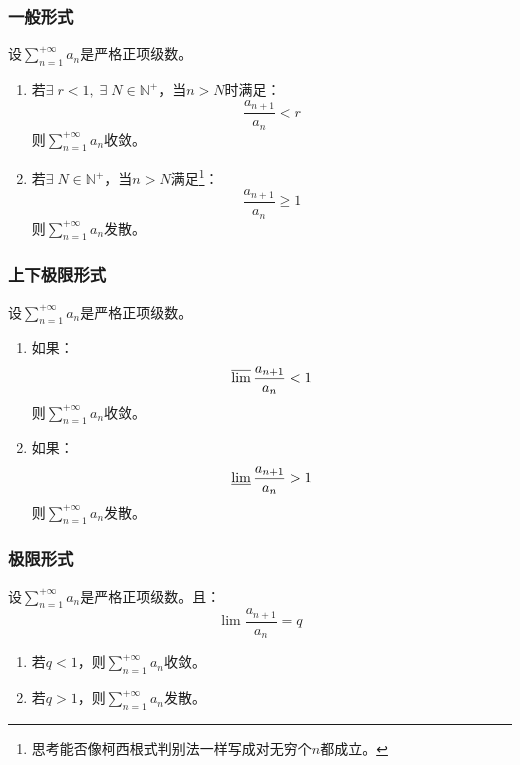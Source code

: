 \subsubsection{一般形式}
\begin{theorem}
	设$\sum\limits_{n=1}^{+\infty}a_n$是严格正项级数。
	\begin{enumerate}
		\item 若$\exists\;r<1,\;\exists\;N\in\mathbb{N}^+$，当$n>N$时满足：
		\begin{equation*}
			\frac{a_{n+1}}{a_n}<r
		\end{equation*}
		则$\sum\limits_{n=1}^{+\infty}a_n$收敛。
		\item 若$\exists\;N\in\mathbb{N}^+$，当$n>N$满足\footnote{思考能否像柯西根式判别法一样写成对无穷个$n$都成立。}：
		\begin{equation*}
			\frac{a_{n+1}}{a_n}\geqslant1
		\end{equation*}
		则$\sum\limits_{n=1}^{+\infty}a_n$发散。
	\end{enumerate}
\end{theorem}
\subsubsection{上下极限形式}
\begin{theorem}
	设$\sum\limits_{n=1}^{+\infty}a_n$是严格正项级数。
	\begin{enumerate}
		\item 如果：
		\begin{equation*}
			\varlimsup\frac{a_{n+1}}{a_n}<1
		\end{equation*}
		则$\sum\limits_{n=1}^{+\infty}a_n$收敛。
		\item 如果：
		\begin{equation*}
			\varliminf\frac{a_{n+1}}{a_n}>1
		\end{equation*}
		则$\sum\limits_{n=1}^{+\infty}a_n$发散。
	\end{enumerate}
\end{theorem}
\subsubsection{极限形式}
\begin{theorem}
	设$\sum\limits_{n=1}^{+\infty}a_n$是严格正项级数。且：
	\begin{equation*}
		\lim \frac{a_{n+1}}{a_n}=q
	\end{equation*}
	\begin{enumerate}
		\item 若$q<1$，则$\sum\limits_{n=1}^{+\infty}a_n$收敛。
		\item 若$q>1$，则$\sum\limits_{n=1}^{+\infty}a_n$发散。
	\end{enumerate}
\end{theorem}
